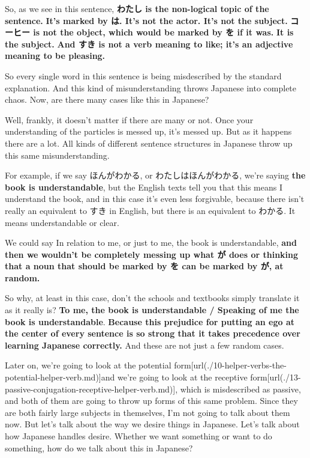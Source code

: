 \thinrule

So, as we see in this sentence, {\bf わたし is the non-logical topic of the sentence.} {\bf It's marked by は. It's not the actor. It's not the subject.} {\bf コーヒー is not the object, which would be marked by を if it was.} {\bf It is the subject.} {\bf And すき is not a verb meaning to like; it's an adjective meaning to be pleasing.}

\thinrule

So every single word in this sentence is being misdescribed by the standard explanation. And this kind of misunderstanding throws Japanese into complete chaos. Now, are there many cases like this in Japanese?

Well, frankly, it doesn't matter if there are many or not. Once your understanding of the particles is messed up, it's messed up. But as it happens there are a lot. All kinds of different sentence structures in Japanese throw up this same misunderstanding.

\thinrule

For example, if we say ほんがわかる, or わたしはほんがわかる, we're saying {\bf the book is understandable}, but the English texts tell you that this means I understand the book, and in this case it's even less forgivable, because there isn't really an equivalent to すき in English, but there is an equivalent to わかる. It means understandable or clear.

{}

We could say In relation to me, or just to me, the book is understandable, {\bf and then we wouldn't be completely messing up what が does or thinking that a noun that should be marked by を can be marked by が, at random.}

\thinrule

So why, at least in this case, don't the schools and textbooks simply translate it as it really is? {\bf To me, the book is understandable / Speaking of me the book is understandable}. {\bf Because this prejudice for putting an ego at the center of every sentence is so strong that it takes precedence over learning Japanese correctly.} And these are not just a few random cases.

Later on, we're going to look at the potential form\goto{{[}10{]}}[url(./10-helper-verbs-the-potential-helper-verb.md)]and we're going to look at the receptive form\goto{{[}13{]}}[url(./13-passive-conjugation-receptive-helper-verb.md)], which is misdescribed as passive, and both of them are going to throw up forms of this same problem. Since they are both fairly large subjects in themselves, I'm not going to talk about them now. But let's talk about the way we desire things in Japanese. Let's talk about how Japanese handles desire. Whether we want something or want to do something, how do we talk about this in Japanese?

